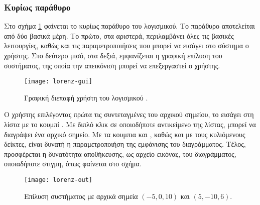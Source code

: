 \subsubsection{Κυρίως παράθυρο}
Στο σχήμα \ref{fig:lorenz-gui} φαίνεται το κυρίως παράθυρο του λογισμικού. Το παράθυρο αποτελείται από δύο βασικά μέρη. Το πρώτο, στα αριστερά, περιλαμβάνει όλες τις βασικές λειτουργίες, καθώς και τις παραμετροποιήσεις που μπορεί να εισάγει στο σύστημα ο χρήστης. Στο δεύτερο μισό, στα δεξιά, εμφανίζεται η γραφική επίλυση του συστήματος, της οποία την απεικόνιση μπορεί να επεξεργαστεί ο χρήστης.
\begin{figure}[!h]
    \centering
    \texttt{[image: lorenz-gui]}
    \caption{Γραφική διεπαφή χρήστη του λογισμικού .}
    \label{fig:lorenz-gui}
\end{figure}

Ο χρήστης επιλέγοντας πρώτα τις συντεταγμένες του αρχικού σημείου, το εισάγει στη λίστα με το κουμπί \textbf{}. Με διπλό κλικ σε οποιοδήποτε αντικείμενο της λίστας, μπορεί να διαγράψει ένα αρχικό σημείο. Με τα κουμπια \textbf{} και \textbf{}, καθώς και με τους κυλιόμενους δείκτες, είναι δυνατή η παραμετροποιήση της εμφάνισης του διαγράμματος. Τέλος, προσφέρεται η δυνατότητα αποθήκευσης, ως αρχείο εικόνας, του διαγράμματος, οποιαδήποτε στιγμη, όπως φαίνεται στο σχήμα. 
\begin{figure}
    \centering
    \texttt{[image: lorenz-out]}
    \caption{Επίλυση συστήματος με αρχικά σημεία $(-5,0,10)$ και $(5,-10,6)$.}
    \label{fig:lorenz-out}
\end{figure}